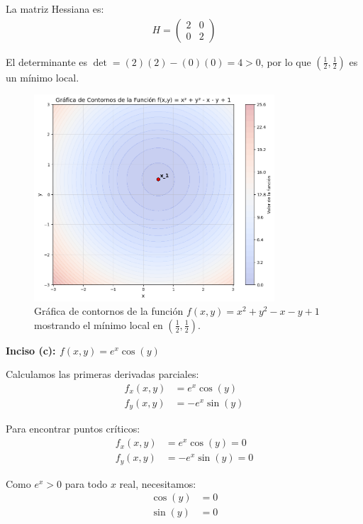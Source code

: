 \documentclass{article}
\begin{document}
La matriz Hessiana es:
\begin{align}
H = \begin{pmatrix} 2 & 0 \\ 0 & 2 \end{pmatrix}
\end{align}

El determinante es $\det = (2)(2) - (0)(0) = 4 > 0$, por lo que $\left(\frac{1}{2}, \frac{1}{2}\right)$ es un mínimo local.

\begin{figure}[h]
\centering
\includegraphics[width=0.8\textwidth]{images/6b_plot.png}
\caption{Gráfica de contornos de la función $f(x,y) = x^{2} + y^{2} - x - y + 1$ mostrando el mínimo local en $(\frac{1}{2}, \frac{1}{2})$.}
\label{fig:6a_contour}
\end{figure}

\textbf{Inciso (c): $f(x,y) = e^{x}\cos(y)$}

Calculamos las primeras derivadas parciales:
\begin{align}
f_x(x,y) &= e^x \cos(y) \\
f_y(x,y) &= -e^x \sin(y)
\end{align}

Para encontrar puntos críticos:
\begin{align}
f_x(x,y) &= e^x \cos(y) = 0 \\
f_y(x,y) &= -e^x \sin(y) = 0
\end{align}

Como $e^x > 0$ para todo $x$ real, necesitamos:
\begin{align}
\cos(y) &= 0 \\
\sin(y) &= 0
\end{align}
\end{document}
